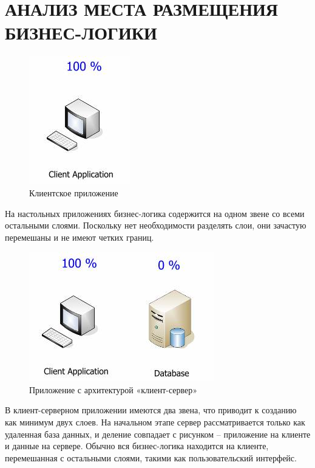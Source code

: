 \documentclass[14pt, a4paper]{extreport}
\begin{document}
\section{\MakeTextUppercase{Анализ места размещения бизнес-логики}}
\begin{figure}[!htb]
  \centering
    \includegraphics[scale=0.6]{../shared_images/business-logic/client.jpg}
   \caption{Клиентское приложение}
    \label{fig:start}
\end{figure}

На настольных приложениях бизнес-логика содержится на одном звене со всеми остальными слоями. Поскольку нет необходимости разделять слои, они зачастую перемешаны и не имеют четких границ.

\begin{figure}[!htb]
  \centering
    \includegraphics[scale=0.6]{../shared_images/business-logic/client-server.jpg}
   \caption{Приложение с архитектурой «клиент-сервер»}
    \label{fig:start}
\end{figure}


В клиент-серверном приложении имеются два звена, что приводит к созданию как минимум двух слоев. На начальном этапе сервер рассматривается только как удаленная база данных, и деление совпадает с рисунком -- приложение на клиенте и данные на сервере. Обычно вся бизнес-логика находится на клиенте, перемешанная с остальными слоями, такими как пользовательский интерфейс.
\end{document}
